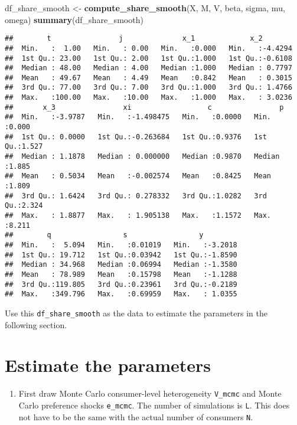 \documentclass[
]{book}
\newenvironment{Shaded}{\begin{snugshade}}{\end{snugshade}}
\newcommand{\KeywordTok}[1]{\textcolor[rgb]{0.13,0.29,0.53}{\textbf{#1}}}
\newcommand{\NormalTok}[1]{#1}
\newcommand{\StringTok}[1]{\textcolor[rgb]{0.31,0.60,0.02}{#1}}
\providecommand{\tightlist}{%
  \setlength{\itemsep}{0pt}\setlength{\parskip}{0pt}}
\begin{document}
\begin{Shaded}
\begin{Highlighting}[]
\NormalTok{df_share_smooth <-}\StringTok{ }\KeywordTok{compute_share_smooth}\NormalTok{(X, M, V, beta, sigma, mu, omega)}
\KeywordTok{summary}\NormalTok{(df_share_smooth)}
\end{Highlighting}
\end{Shaded}

\begin{verbatim}
##        t                j              x_1             x_2         
##  Min.   :  1.00   Min.   : 0.00   Min.   :0.000   Min.   :-4.4294  
##  1st Qu.: 23.00   1st Qu.: 2.00   1st Qu.:1.000   1st Qu.:-0.6108  
##  Median : 48.00   Median : 4.00   Median :1.000   Median : 0.7797  
##  Mean   : 49.67   Mean   : 4.49   Mean   :0.842   Mean   : 0.3015  
##  3rd Qu.: 77.00   3rd Qu.: 7.00   3rd Qu.:1.000   3rd Qu.: 1.4766  
##  Max.   :100.00   Max.   :10.00   Max.   :1.000   Max.   : 3.0236  
##       x_3                xi                  c                p        
##  Min.   :-3.9787   Min.   :-1.498475   Min.   :0.0000   Min.   :0.000  
##  1st Qu.: 0.0000   1st Qu.:-0.263684   1st Qu.:0.9376   1st Qu.:1.527  
##  Median : 1.1878   Median : 0.000000   Median :0.9870   Median :1.885  
##  Mean   : 0.5034   Mean   :-0.002574   Mean   :0.8425   Mean   :1.809  
##  3rd Qu.: 1.6424   3rd Qu.: 0.278332   3rd Qu.:1.0282   3rd Qu.:2.324  
##  Max.   : 1.8877   Max.   : 1.905138   Max.   :1.1572   Max.   :8.211  
##        q                 s                 y          
##  Min.   :  5.094   Min.   :0.01019   Min.   :-3.2018  
##  1st Qu.: 19.712   1st Qu.:0.03942   1st Qu.:-1.8590  
##  Median : 34.968   Median :0.06994   Median :-1.3580  
##  Mean   : 78.989   Mean   :0.15798   Mean   :-1.1288  
##  3rd Qu.:119.805   3rd Qu.:0.23961   3rd Qu.:-0.2189  
##  Max.   :349.796   Max.   :0.69959   Max.   : 1.0355
\end{verbatim}

Use this \texttt{df\_share\_smooth} as the data to estimate the parameters in the following section.

\hypertarget{estimate-the-parameters}{%
\section{Estimate the parameters}\label{estimate-the-parameters}}

\begin{enumerate}
\def\labelenumi{\arabic{enumi}.}
\tightlist
\item
  First draw Monte Carlo consumer-level heterogeneity \texttt{V\_mcmc} and Monte Carlo preference shocks \texttt{e\_mcmc}. The number of simulations is \texttt{L}. This does not have to be the same with the actual number of consumers \texttt{N}.
\end{enumerate}
\end{document}
